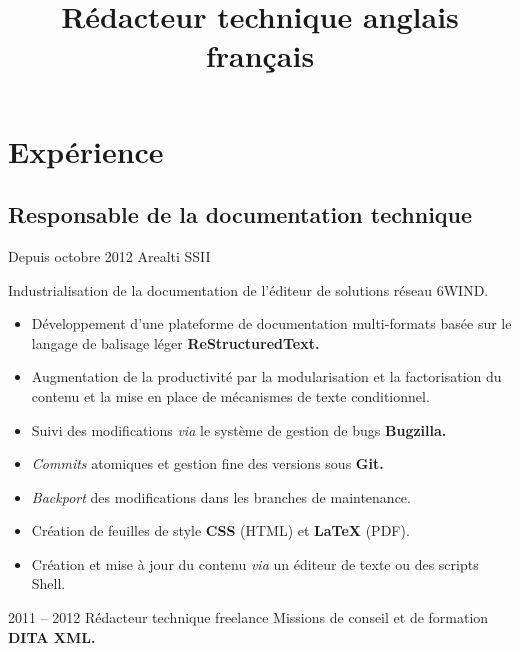 \documentclass[12pt,a4paper,roman]{moderncv}
\title
    {Rédacteur technique anglais français}
\begin{document}
\makecvtitle %


\section{Expérience}

\subsection{Responsable de la documentation technique}

\cventry
    {Depuis octobre 2012}
    {Arealti}
    {SSII}
    {}
    {}
    {Industrialisation de la documentation de l'éditeur de solutions réseau
      6WIND.
      \begin{itemize}
      \item Développement d'une plateforme de documentation multi-formats
        basée sur le langage de balisage léger \textbf{ReStructuredText.}
      \item Augmentation de la productivité par la modularisation et la
        factorisation du contenu et la mise en place de mécanismes de texte
        conditionnel.
      \item Suivi des modifications \emph{via} le système de gestion de
        bugs \textbf{Bugzilla.}
      \item \emph{Commits} atomiques et gestion fine des versions sous
        \textbf{Git.}
      \item \emph{Backport} des modifications dans les branches de
        maintenance.
      \item Création de feuilles de style \textbf{CSS} (HTML) et
        \textbf{\LaTeX} (PDF).
      \item Création et mise à jour du contenu \emph{via} un éditeur de texte
        ou des scripts Shell.
      \end{itemize}
    }


\cventry
    {2011 – 2012}
    {Rédacteur technique freelance}
    {\textsc{}}
    {}
    {}
    {Missions de conseil et de formation \textbf{DITA XML.}}

\end{document}
